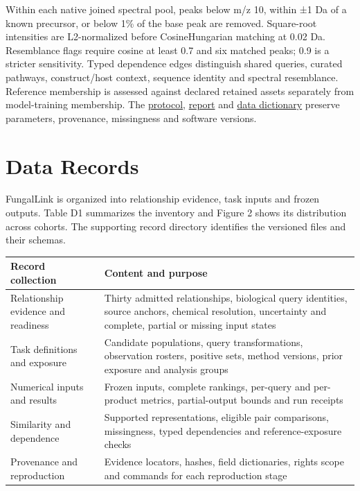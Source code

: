 \documentclass[
  10pt,
  a4paper,
]{article}
\newcounter{none} %
\begin{document}
Within each native joined spectral pool, peaks below m/z 10, within ±1 Da of a known precursor, or below 1\% of the base peak are removed. Square-root intensities are L2-normalized before CosineHungarian matching at 0.02 Da. Resemblance flags require cosine at least 0.7 and six matched peaks; 0.9 is a stricter sensitivity. Typed dependence edges distinguish shared queries, curated pathways, construct/host context, sequence identity and spectral resemblance. Reference membership is assessed against declared retained assets separately from model-training membership. The \href{https://github.com/vinvomero/fungallink-benchmark/blob/main/protocol/similarity-independence-v1.md}{protocol}, \href{https://github.com/vinvomero/fungallink-benchmark/blob/main/docs/evaluation/similarity-independence-v1.md}{report} and \href{https://github.com/vinvomero/fungallink-benchmark/blob/main/docs/release/similarity-independence-v1.md}{data dictionary} preserve parameters, provenance, missingness and software versions.

\section{Data Records}\label{data-records}

FungalLink is organized into relationship evidence, task inputs and frozen outputs. Table D1 summarizes the inventory and Figure 2 shows its distribution across cohorts. The supporting record directory identifies the versioned files and their schemas.

{\def\LTcaptype{none} %
\begin{longtable}[]{@{}
  >{\raggedright\arraybackslash}p{}
  >{\raggedright\arraybackslash}p{}@{}}
\toprule\noalign{}
\begin{minipage}[b]{\linewidth}\raggedright
Record collection
\end{minipage} & \begin{minipage}[b]{\linewidth}\raggedright
Content and purpose
\end{minipage} \\
\midrule\noalign{}
\endhead
\bottomrule\noalign{}
\endlastfoot
Relationship evidence and readiness & Thirty admitted relationships, biological query identities, source anchors, chemical resolution, uncertainty and complete, partial or missing input states \\
Task definitions and exposure & Candidate populations, query transformations, observation rosters, positive sets, method versions, prior exposure and analysis groups \\
Numerical inputs and results & Frozen inputs, complete rankings, per-query and per-product metrics, partial-output bounds and run receipts \\
Similarity and dependence & Supported representations, eligible pair comparisons, missingness, typed dependencies and reference-exposure checks \\
Provenance and reproduction & Evidence locators, hashes, field dictionaries, rights scope and commands for each reproduction stage \\
\end{longtable}
}
\end{document}
